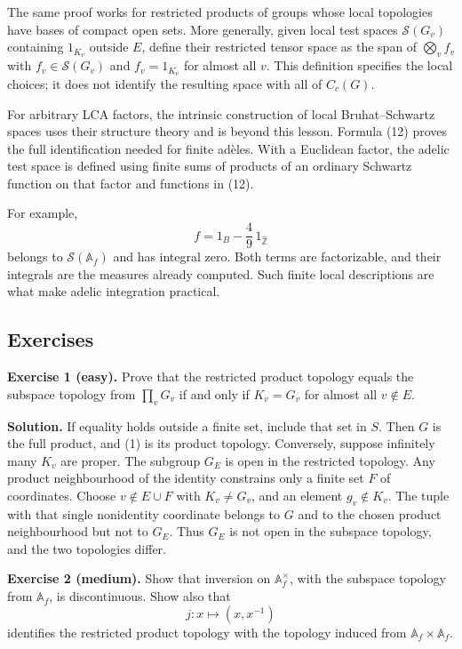 \documentclass[
  english,
  11pt,
  a4paper,
]{article}
\begin{document}
The same proof works for restricted products of groups whose local
topologies have bases of compact open sets. More generally, given local
test spaces \(\mathcal S(G_v)\) containing \(1_{K_v}\) outside \(E\),
define their restricted tensor space as the span of \(\bigotimes_v f_v\)
with \(f_v\in\mathcal S(G_v)\) and \(f_v=1_{K_v}\) for almost all \(v\).
This definition specifies the local choices; it does not identify the
resulting space with all of \(C_c(G)\).

For arbitrary LCA factors, the intrinsic construction of local
Bruhat--Schwartz spaces uses their structure theory and is beyond this
lesson. Formula (12) proves the full identification needed for finite
adèles. With a Euclidean factor, the adelic test space is defined using
finite sums of products of an ordinary Schwartz function on that factor
and functions in (12).

For example, \[f=1_B-\frac49\,1_{\widehat{\mathbb Z}}\] belongs to
\(\mathcal S(\mathbb A_f)\) and has integral zero. Both terms are
factorizable, and their integrals are the measures already computed.
Such finite local descriptions are what make adelic integration
practical.

\subsection{Exercises}\label{NT-ADL-01--exercises}

\textbf{Exercise 1 (easy).} Prove that the restricted product topology
equals the subspace topology from \(\prod_vG_v\) if and only if
\(K_v=G_v\) for almost all \(v\notin E\).

\textbf{Solution.} If equality holds outside a finite set, include that
set in \(S\). Then \(G\) is the full product, and (1) is its product
topology. Conversely, suppose infinitely many \(K_v\) are proper. The
subgroup \(G_E\) is open in the restricted topology. Any product
neighbourhood of the identity constrains only a finite set \(F\) of
coordinates. Choose \(v\notin E\cup F\) with \(K_v\neq G_v\), and an
element \(g_v\notin K_v\). The tuple with that single nonidentity
coordinate belongs to \(G\) and to the chosen product neighbourhood but
not to \(G_E\). Thus \(G_E\) is not open in the subspace topology, and
the two topologies differ.

\textbf{Exercise 2 (medium).} Show that inversion on
\(\mathbb A_f^\times\), with the subspace topology from \(\mathbb A_f\),
is discontinuous. Show also that \[j:x\longmapsto(x,x^{-1})\] identifies
the restricted product topology with the topology induced from
\(\mathbb A_f\times\mathbb A_f\).
\end{document}
